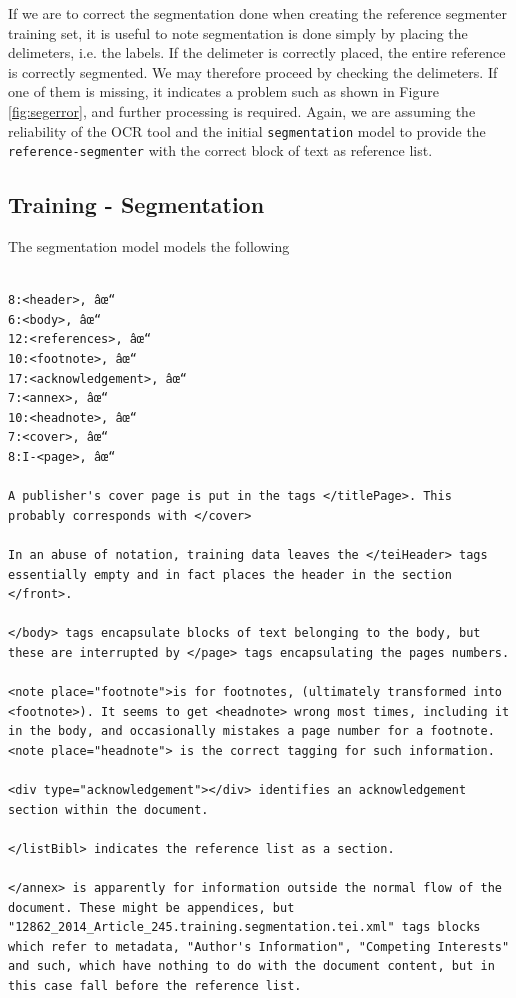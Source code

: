 \documentclass[11pt, oneside]{scrartcl}   	%
\begin{document}
If we are to correct the segmentation done when creating the reference segmenter training set, it is useful to note segmentation is done simply by placing the delimeters, i.e. the labels. If the delimeter is correctly placed, the entire reference is correctly segmented. We may therefore proceed by checking the delimeters. If one of them is missing, it indicates a problem such as shown in Figure \ref{fig:segerror}, and further processing is required. Again, we are assuming the reliability of the OCR tool and the initial \texttt{segmentation} model to provide the \texttt{reference-segmenter} with the correct block of text as reference list.

\subsection{Training - Segmentation}

The segmentation model models the following 

\begin{verbatim}

8:<header>, âœ“
6:<body>, âœ“
12:<references>, âœ“
10:<footnote>, âœ“
17:<acknowledgement>, âœ“
7:<annex>, âœ“
10:<headnote>, âœ“
7:<cover>, âœ“
8:I-<page>, âœ“

A publisher's cover page is put in the tags </titlePage>. This probably corresponds with </cover>

In an abuse of notation, training data leaves the </teiHeader> tags essentially empty and in fact places the header in the section </front>. 

</body> tags encapsulate blocks of text belonging to the body, but these are interrupted by </page> tags encapsulating the pages numbers.

<note place="footnote">is for footnotes, (ultimately transformed into <footnote>). It seems to get <headnote> wrong most times, including it in the body, and occasionally mistakes a page number for a footnote. <note place="headnote"> is the correct tagging for such information.

<div type="acknowledgement"></div> identifies an acknowledgement section within the document.

</listBibl> indicates the reference list as a section.

</annex> is apparently for information outside the normal flow of the document. These might be appendices, but "12862_2014_Article_245.training.segmentation.tei.xml" tags blocks which refer to metadata, "Author's Information", "Competing Interests" and such, which have nothing to do with the document content, but in this case fall before the reference list.

\end{verbatim}
\end{document}
